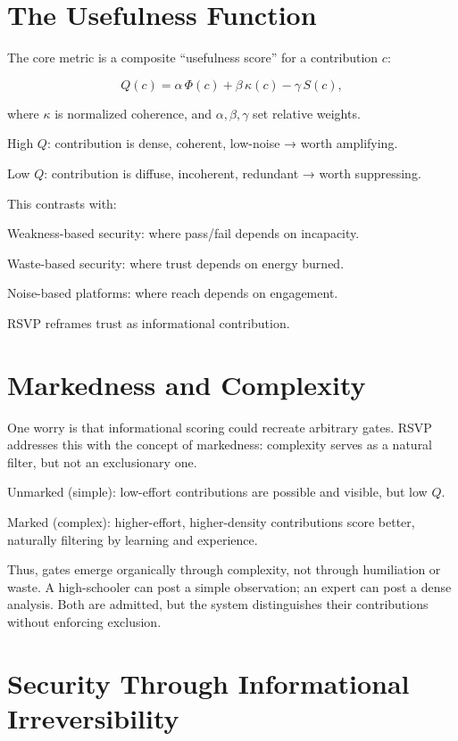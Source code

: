 \documentclass{book}
\begin{document}
\section{The Usefulness Function}

The core metric is a composite ``usefulness score'' for a contribution \( c \):

\[ Q(c) = \alpha \, \Phi(c) + \beta \, \kappa(c) - \gamma \, S(c), \]

where \(\kappa\) is normalized coherence, and \(\alpha, \beta, \gamma\) set relative weights.

High \( Q \): contribution is dense, coherent, low-noise → worth amplifying.

Low \( Q \): contribution is diffuse, incoherent, redundant → worth suppressing.

This contrasts with:

Weakness-based security: where pass/fail depends on incapacity.

Waste-based security: where trust depends on energy burned.

Noise-based platforms: where reach depends on engagement.

RSVP reframes trust as informational contribution.

\section{Markedness and Complexity}

One worry is that informational scoring could recreate arbitrary gates. RSVP addresses this with the concept of markedness: complexity serves as a natural filter, but not an exclusionary one.

Unmarked (simple): low-effort contributions are possible and visible, but low \( Q \).

Marked (complex): higher-effort, higher-density contributions score better, naturally filtering by learning and experience.

Thus, gates emerge organically through complexity, not through humiliation or waste. A high-schooler can post a simple observation; an expert can post a dense analysis. Both are admitted, but the system distinguishes their contributions without enforcing exclusion.

\section{Security Through Informational Irreversibility}
\end{document}
